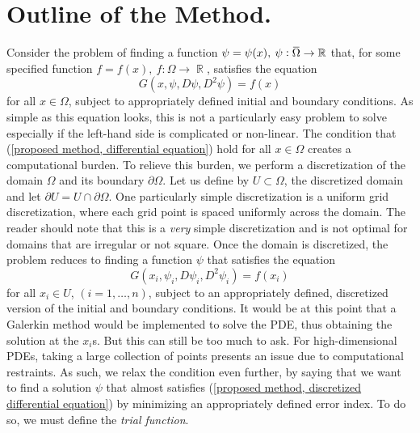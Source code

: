 \documentclass[10pt]{article}
\theoremstyle{plain}
\theoremstyle{definition}
\theoremstyle{remark}
\numberwithin{theorem}{section}
\numberwithin{proposition}{section}
\numberwithin{remark}{section}
\numberwithin{corollary}{section}
\numberwithin{definition}{section}
\numberwithin{lemma}{section}
\numberwithin{equation}{section}
\newcommand{\overbar}[1]{\mkern 1.5mu\overline{\mkern-1.5mu#1\mkern-1.5mu}\mkern 1.5mu}
\DeclareMathOperator{\R}{\mathbb{R}}
\begin{document}
\section{Outline of the Method.}
Consider the problem of finding a function $\psi = \psi(x), \: \psi: \overbar{\Omega} \to \mathbb{R}$ that, for some specified function $f = f(x), \: f: \Omega \to \R$, satisfies the equation 
\begin{equation}
	\label{proposed method, differential equation}
	\displaystyle G(x, \psi, D\psi, D^2\psi) = f(x)
\end{equation}
for all $x \in \Omega$, subject to appropriately defined initial and boundary conditions. As simple as this equation looks, this is not a particularly easy problem to solve especially if the left-hand side is complicated or non-linear. The condition that (\ref{proposed method, differential equation}) hold for all $x \in \Omega$ creates a computational burden. To relieve this burden, we perform a discretization of the domain $\Omega$ and its boundary $\partial \Omega$. Let us define by $U \subset \Omega$, the discretized domain and let $\partial U = U \cap \partial \Omega$. One particularly simple discretization is a uniform grid discretization, where each grid point is spaced uniformly across the domain. The reader should note that this is a \textit{very} simple discretization and is not optimal for domains that are irregular or not square. Once the domain is discretized, the problem reduces to finding a function $\psi$ that satisfies the equation
\begin{equation}
	\label{proposed method, discretized differential equation}
	\displaystyle G(x_i, \psi_i, D\psi_i, D^2\psi_i) = f(x_i)
\end{equation}
for all $x_i \in U$, $(i = 1, \dots, n)$, subject to an appropriately defined, discretized version of the initial and boundary conditions. It would be at this point that a Galerkin method would be implemented to solve the PDE, thus obtaining the solution at the $x_i$s. But this can still be too much to ask. For high-dimensional PDEs, taking a large collection of points presents an issue due to computational restraints. As such, we relax the condition even further, by saying that we want to find a solution $\psi$ that almost satisfies (\ref{proposed method, discretized differential equation}) by minimizing an appropriately defined error index. To do so, we must define the \textit{trial function}.  
\end{document}
